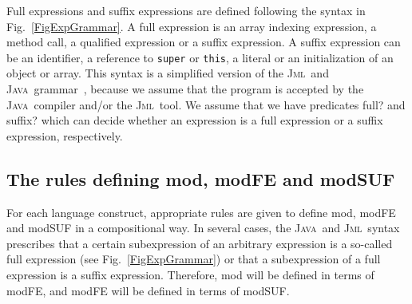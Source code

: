 \documentclass[a4paper]{llncs}
\newcommand{\jml}{\textsc{Jml}}
\newcommand{\java}{\textsc{Java}}
\begin{document}
Full expressions and suffix expressions are defined following the
syntax in Fig.~\ref{FigExpGrammar}. A full expression is an array
indexing expression, a method call, a qualified expression or a suffix
expression. A suffix expression can be an identifier, a reference to
\texttt{super} or \texttt{this}, a literal or an initialization of an 
object or array.  This syntax is a simplified version of the
\jml\ and \java\ grammar~\cite{LeavensBR00,GoslingJSB00}, because we 
assume that the program is accepted by the \java\ compiler and/or the
\jml\ tool.%
We assume that we have predicates \textsf{full?} and
\textsf{suffix?} which can decide whether an expression is a full
expression or a suffix expression, respectively.



%




\subsection{The rules defining \textsf{mod}, \textsf{modFE} and \textsf{modSUF}}
For each language construct, appropriate rules are given to define
\textsf{mod}, \textsf{modFE} and \textsf{modSUF} in a compositional
way.  In several cases, the
\java\ and \jml\ syntax prescribes that a certain subexpression of an 
arbitrary expression is a so-called full expression (see
Fig.~\ref{FigExpGrammar}) or that a subexpression of a full expression
is a suffix expression. Therefore, \textsf{mod} will be defined in
terms of \textsf{modFE}, and \textsf{modFE} will be defined in terms
of \textsf{modSUF}.
\end{document}
